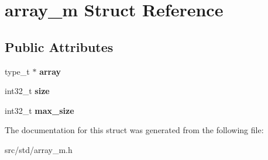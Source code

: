 \hypertarget{structarray__m}{}\section{array\+\_\+m Struct Reference}
\label{structarray__m}
\subsection*{Public Attributes}
\begin{DoxyCompactItemize}
\item 
\mbox{\label{structarray__m_a3100d10c106915f0229ae25749d1139f}} 
type\+\_\+t $\ast$ {\bfseries array}
\item 
\mbox{\label{structarray__m_a2f7d10fce563031914bd18bcd36c5ba0}} 
int32\+\_\+t {\bfseries size}
\item 
\mbox{\label{structarray__m_aa9b071c57cc90a5626b88e4f0c93e951}} 
int32\+\_\+t {\bfseries max\+\_\+size}
\end{DoxyCompactItemize}


The documentation for this struct was generated from the following file\+:\begin{DoxyCompactItemize}
\item 
src/std/array\+\_\+m.\+h\end{DoxyCompactItemize}
